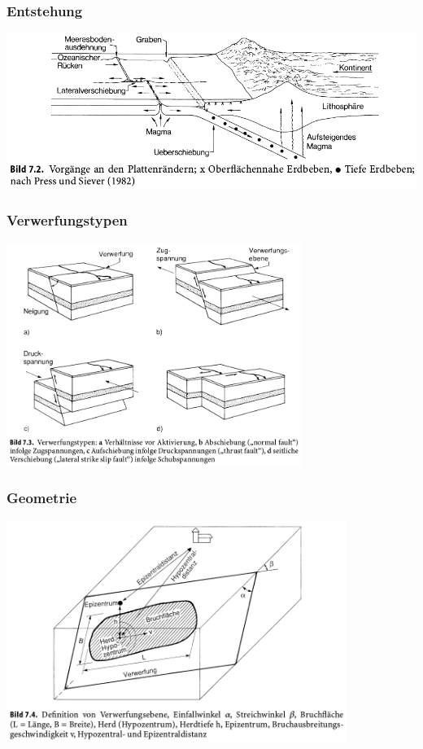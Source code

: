 \begin{frame}
\frametitle{Entstehung}
\includegraphics[width=\textwidth]{fig_img/plattenraender} %
\end{frame}


\begin{frame}
\frametitle{Verwerfungstypen}
\includegraphics[width=0.72\textwidth]{fig_img/verwerfungstypen} %
\end{frame}


\begin{frame}
\frametitle{Geometrie}
\includegraphics[width=0.83\textwidth]{fig_img/erdbebengeometrie} %
\end{frame}


